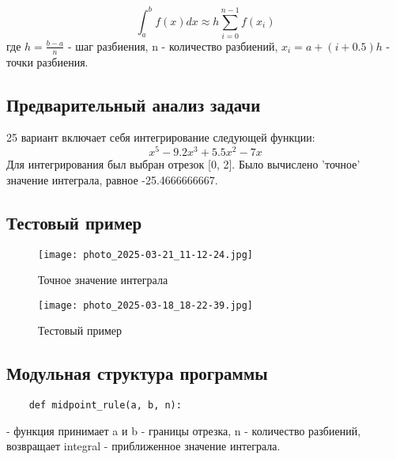 \documentclass[12pt]{article}
\begin{document}
\begin{equation*}
    \int_a^bf(x)dx\approx h \sum\limits_{i=0}^{n-1}f(x_i)
\end{equation*}
где $h=\frac{b-a}{n}$ - шаг разбиения, n - количество разбиений, $x_i=a+(i+0.5)h$ - точки разбиения.
\begin{center}
    \section{Предварительный анализ задачи}
\end{center}
25 вариант включает себя интегрирование следующей функции:
\begin{equation*}
    x^5 - 9.2x^3 + 5.5x^2 - 7x 
\end{equation*}
Для интегрирования был выбран отрезок [0, 2]. Было вычислено 'точное' значение интеграла, равное -25.4666666667.

\vspace{1cm}

\begin{center}
    \section{Тестовый пример}
\end{center}

\begin{figure}[H]
    \centering
    \texttt{[image: photo\_2025-03-21\_11-12-24.jpg]}
    \caption{Точное значение интеграла}
    \label{fig:enter-label}
\end{figure}

\begin{figure}[H]
    \centering
    \texttt{[image: photo\_2025-03-18\_18-22-39.jpg]}
    \caption{Тестовый пример}
    \label{fig:enter-label}
\end{figure}

\begin{center}
    \section{Модульная структура программы}
\end{center}
\begin{lstlisting}
    def midpoint_rule(a, b, n):
\end{lstlisting} - функция принимает a и b - границы отрезка, n - количество разбиений, возвращает integral - приближенное значение интеграла.
\end{document}
